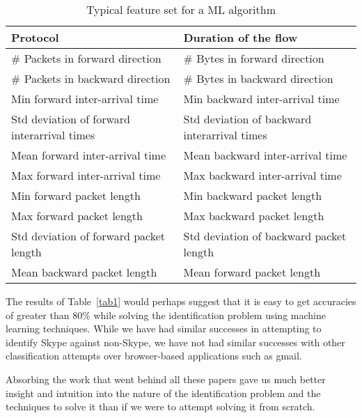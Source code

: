 \begin{table}[htbp]
\begin{tabular}{|l|l|}
\hline
 Protocol &   Duration of the flow\\
\hline
\# Packets in forward direction & \# Bytes in forward direction\\
\# Packets in backward direction & \# Bytes in backward direction\\
Min forward inter-arrival time  & Min backward inter-arrival time\\
Std deviation of forward interarrival
times &
Std deviation of backward interarrival
times\\
Mean forward inter-arrival time & Mean backward inter-arrival time\\
Max forward inter-arrival time &  Max backward inter-arrival time\\
Min forward packet length & Min backward packet length\\
Max forward packet length & Max backward packet length\\
Std deviation of forward packet
length &
Std deviation of backward packet
length\\
Mean backward packet length &Mean forward packet length\\
\hline
\end{tabular}
\caption{\label{flfeatures}Typical feature set for a ML algorithm}
\end{table}

The results of Table~\ref{tab1} would perhaps suggest that it is easy
to get accuracies of greater than $80\%$ while solving the identification
problem using machine learning techniques.  While we have had similar
successes in attempting to identify Skype against non-Skype, we have
not had similar successes with other classification attempts over
browser-based applications such as gmail.

Absorbing the work that went behind all these papers gave us much better insight and intuition into the nature of the identification problem and the techniques to solve it than if we were to attempt solving it from scratch. 
